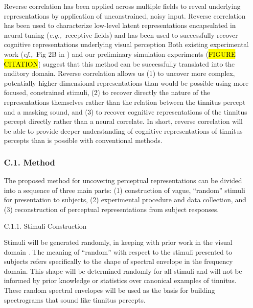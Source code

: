\documentclass[11pt, notitlepage]{article} %
\def\eg{{\emph{e.g.,}}~}
\def\cf{{\emph{cf.,}}~}
\begin{document}
Reverse correlation has been applied across multiple fields to reveal underlying representations by application of unconstrained, noisy input.
Reverse correlation has been used to characterize low-level latent representations encapsulated in neural tuning
(\eg receptive fields) \cite{ringachReverseCorrelationNeurophysiology2004}
and has been used to successfully recover cognitive representations underlying visual perception \cite{gosselinSuperstitiousPerceptionsReveal2003,}
Both existing experimental work (\cf Fig 2B in \cite{brimijoinInternalRepresentationVowel2013})
and our preliminary simulation experiments (\hl{FIGURE CITATION}) suggest that this method can be successfully translated
into the auditory domain.
Reverse correlation allows us (1) to uncover more complex, potentially higher-dimensional representations
than would be possible using more focused, constrained stimuli,
(2) to recover directly the nature of the representations themselves rather than the relation
between the tinnitus percept and a masking sound,
and (3) to recover cognitive representations of the tinnitus percept directly rather than a neural correlate.
In short, reverse correlation will be able to provide deeper understanding of cognitive representations of tinnitus percepts
than is possible with conventional methods.

\subsubsection*{C.1. Method}

The proposed method for uncovering perceptual representations can be divided
into a sequence of three main parts:
(1) construction of vague, ``random'' stimuli for presentation to subjects,
(2) experimental procedure and data collection,
and (3) reconstruction of perceptual representations from subject responses.

\begin{description}
	\item[C.1.1. Stimuli Construction]{}
\end{description}

Stimuli will be generated randomly, in keeping with prior work in the visual domain
\cite{gosselinSuperstitiousPerceptionsReveal2003}.
The meaning of ``random'' with respect to the stimuli presented to subjects
refers specifically to the shape of spectral envelope in the frequency domain.
This shape will be determined randomly for all stimuli
and will not be informed by prior knowledge
or statistics over canonical examples of tinnitus.
These random spectral envelopes will be used as the basis for building spectrograms
that sound like tinnitus percepts.
\end{document}
